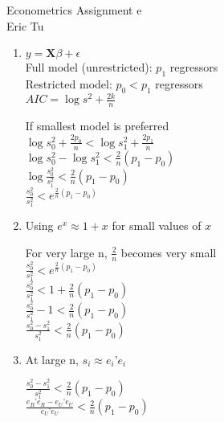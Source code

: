 \documentclass{article}
\begin{document}
\begin{center}
Econometrics Assignment e \\
Eric Tu
\end{center}

\begin{enumerate}[label=(\alph*)]
	\item
	$y = \mathbf{X} \beta + \epsilon $ \\
	Full model (unrestricted): $p_{1}$  regressors\\
	Restricted model: $p_{0} < p_{1}$ regressors\\	
	$AIC =\log{s^{2}} + \frac{2k}{n}$\\
	
	\begin{center}
	If smallest model is preferred \\[6pt]
	$\log{s_{0}^{2}} + \frac{2p_{0}}{n} < \log{s_{1}^{2}} + \frac{2p_{1}}{n} $\\[6pt]

	$\log{s_{0}^{2}} - \log{s_{1}^{2}} < \frac{2}{n}(p_{1} - p_{0}) $\\[6pt]

	$\log{\frac{s_{0}^{2}}{s_{1}^{2}}} < \frac{2}{n}(p_{1} - p_{0}) $\\[6pt]

	$\frac{s_{0}^{2}}{s_{1}^{2}} < e^{\frac{2}{n}(p_{1} - p_{0})} $\\[6pt]
	\end{center}
	
	\item Using $e^{x} \approx 1+x$ for small values of $x$ \\
	\begin{center}
	For very large n, $\frac{2}{n}$ becomes very small \\
	$\frac{s_{0}^{2}}{s_{1}^{2}} < e^{\frac{2}{n}(p_{1} - p_{0})} $\\[6pt]
	$\frac{s_{0}^{2}}{s_{1}^{2}} < 1 + \frac{2}{n}(p_{1} - p_{0}) $\\[6pt]
	$\frac{s_{0}^{2}}{s_{1}^{2}} -1 < \frac{2}{n}(p_{1} - p_{0}) $\\[6pt]
	$\frac{s_{0}^{2} - s_{1}^{2}}{s_{1}^{2}} < \frac{2}{n}(p_{1} - p_{0}) $\\[6pt]
	\end{center}
	
	\item At large n, $s_{i} \approx e_{i}’e_{i}$
	
	\begin{center}
	$\frac{s_{0}^{2} - s_{1}^{2}}{s_{1}^{2}} < \frac{2}{n}(p_{1} - p_{0}) $\\[6pt]
	$\frac{e_{R}’e_{R} - e_{U}’e_{U}}{e_{U}’e_{U}} < \frac{2}{n}(p_{1} - p_{0}) $\\[6pt]
	\end{center}
	

\end{enumerate}
\end{document}
